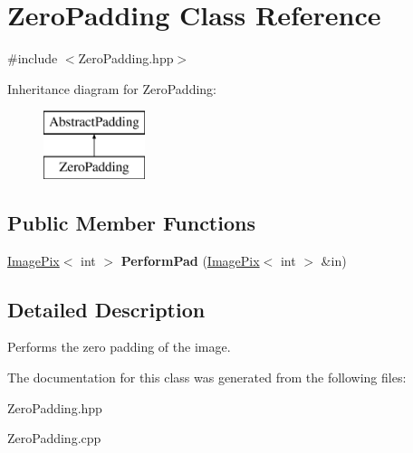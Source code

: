 \hypertarget{class_zero_padding}{}\section{Zero\+Padding Class Reference}
\label{class_zero_padding}


{\ttfamily \#include $<$Zero\+Padding.\+hpp$>$}

Inheritance diagram for Zero\+Padding\+:\begin{figure}[H]
\begin{center}
\leavevmode
\includegraphics[height=2.000000cm]{class_zero_padding}
\end{center}
\end{figure}
\subsection*{Public Member Functions}
\begin{DoxyCompactItemize}
\item 
\mbox{\label{class_zero_padding_af321474d0c1285317d38f01a7b91ed7d}} 
\hyperlink{class_image_pix}{Image\+Pix}$<$ int $>$ {\bfseries Perform\+Pad} (\hyperlink{class_image_pix}{Image\+Pix}$<$ int $>$ \&in)
\end{DoxyCompactItemize}


\subsection{Detailed Description}
Performs the zero padding of the image. 

The documentation for this class was generated from the following files\+:\begin{DoxyCompactItemize}
\item 
Zero\+Padding.\+hpp\item 
Zero\+Padding.\+cpp\end{DoxyCompactItemize}
